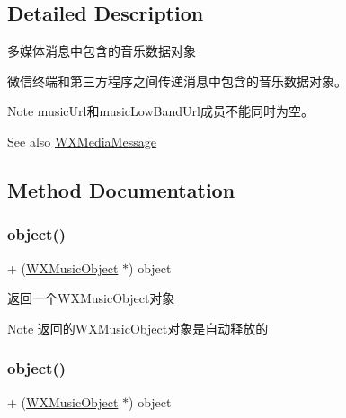 \subsection{Detailed Description}
多媒体消息中包含的音乐数据对象 

微信终端和第三方程序之间传递消息中包含的音乐数据对象。 \begin{DoxyNote}{Note}
music\+Url和music\+Low\+Band\+Url成员不能同时为空。 
\end{DoxyNote}
\begin{DoxySeeAlso}{See also}
\mbox{\hyperlink{interface_w_x_media_message}{W\+X\+Media\+Message}} 
\end{DoxySeeAlso}


\subsection{Method Documentation}
\mbox{\label{interface_w_x_music_object_a49035b71c92e1366fd87a938ac991f47}} 
\subsubsection{\texorpdfstring{object()}{object()}\hspace{0.1cm}{\footnotesize\ttfamily [1/3]}}
{\footnotesize\ttfamily + (\mbox{\hyperlink{interface_w_x_music_object}{W\+X\+Music\+Object}} $\ast$) object \begin{DoxyParamCaption}{ }\end{DoxyParamCaption}}



返回一个\+W\+X\+Music\+Object对象 

\begin{DoxyNote}{Note}
返回的\+W\+X\+Music\+Object对象是自动释放的 
\end{DoxyNote}
\mbox{\label{interface_w_x_music_object_a49035b71c92e1366fd87a938ac991f47}} 
\subsubsection{\texorpdfstring{object()}{object()}\hspace{0.1cm}{\footnotesize\ttfamily [2/3]}}
{\footnotesize\ttfamily + (\mbox{\hyperlink{interface_w_x_music_object}{W\+X\+Music\+Object}} $\ast$) object \begin{DoxyParamCaption}{ }\end{DoxyParamCaption}}



